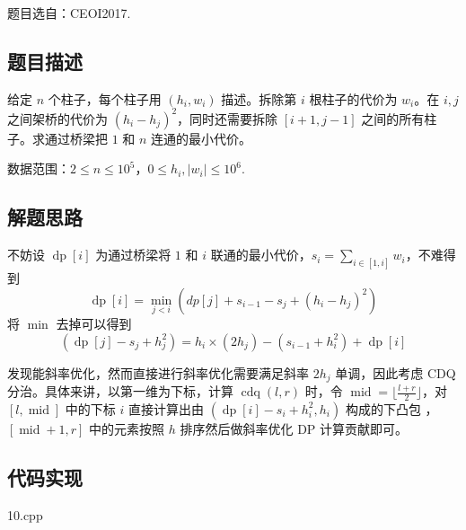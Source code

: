 题目选自：CEOI2017.

\subsection{题目描述}

给定 \(n\) 个柱子，每个柱子用 \((h_i,w_i)\) 描述。拆除第 \(i\)
根柱子的代价为 \(w_i\)。在 \(i,j\) 之间架桥的代价为
\((h_i-h_j)^2\)，同时还需要拆除 \([i+1,j-1]\)
之间的所有柱子。求通过桥梁把 \(1\) 和 \(n\) 连通的最小代价。

数据范围：\(2\leq n\leq 10^5\)，\(0\leq h_i,|w_i|\leq 10^6\).

\subsection{解题思路}

不妨设 \(\operatorname{dp}[i]\) 为通过桥梁将 \(1\) 和 \(i\)
联通的最小代价，\(s_i=\sum_{i\in[1,i]}w_i\)，不难得到 \[
\operatorname{dp}[i]=\min_{j < i}(dp[j]+s_{i-1}-s_j+(h_i-h_j)^2)
\] 将 \(\min\) 去掉可以得到 \[
(\operatorname{dp}[j]-s_j+h_j^2)=h_i\times(2h_j)-(s_{i-1}+h_i^2)+\operatorname{dp}[i]
\]

发现能斜率优化，然而直接进行斜率优化需要满足斜率 \(2h_j\) 单调，因此考虑
CDQ 分治。具体来讲，以第一维为下标，计算 \(\operatorname{cdq}(l,r)\)
时，令 \(\operatorname{mid}=\lfloor\frac{l+r}{2}\rfloor\)，对
\([l,\operatorname{mid}]\) 中的下标 \(i\) 直接计算出由
\((\operatorname{dp}[i]-s_i+h_i^2,h_i)\) 构成的下凸包
，\([\operatorname{mid}+1,r]\) 中的元素按照 \(h\) 排序然后做斜率优化 DP
计算贡献即可。

\subsection{代码实现}

10.cpp
